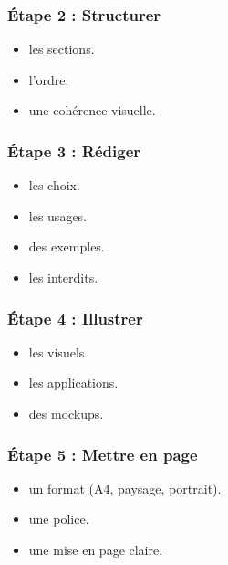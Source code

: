 \subsubsection{Étape 2 : Structurer}

\begin{itemize}
    \item {} les sections.
    \item {} l'ordre.
    \item {} une cohérence visuelle.
\end{itemize}

\subsubsection{Étape 3 : Rédiger}

\begin{itemize}
    \item {} les choix.
    \item {} les usages.
    \item {} des exemples.
    \item {} les interdits.
\end{itemize}

\subsubsection{Étape 4 : Illustrer}

\begin{itemize}
    \item {} les visuels.
    \item {} les applications.
    \item {} des mockups.
\end{itemize}

\subsubsection{Étape 5 : Mettre en page}

\begin{itemize}
    \item {} un format (A4, paysage, portrait).
    \item {} une police.
    \item {} une mise en page claire.
\end{itemize}

